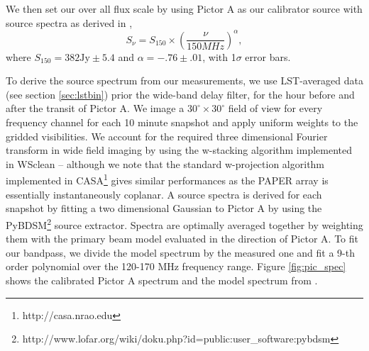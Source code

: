 \documentclass[twocolumn,numberedappendix]{emulateapj} \shorttitle{PSA64}
\begin{document}
We then set our over all flux scale by using Pictor A as our calibrator source
with source spectra as derived in \cite{jacobs_et_al2013}, 
\begin{equation}
    S_{\nu} = S_{150}\times\left(\frac{\nu}{150MHz}\right)^{\alpha},
\end{equation}
where $S_{150} = 382 \text{Jy} \pm 5.4$ and $\alpha = -.76 \pm .01$, with
1$\sigma$ error bars.




To derive the source spectrum from our measurements, we use LST-averaged data
(see section \ref{sec:lstbin}) prior the wide-band delay filter, for the hour
before and after the transit of Pictor A. We image a $30^\circ \times 30^\circ$
field of view for every frequency channel for each 10 minute snapshot and apply
uniform weights to the gridded visibilities. We account for the required three
dimensional Fourier transform in wide field imaging by using the w-stacking
algorithm implemented in WSclean \citep{offringa_et_al2014} – although we note that
the standard w-projection algorithm implemented in
CASA\footnote{http://casa.nrao.edu} gives similar performances as the PAPER
array is essentially instantaneously coplanar.  A source spectra is derived for
each snapshot by fitting a two dimensional Gaussian to Pictor A by using the
PyBDSM\footnote{http://www.lofar.org/wiki/doku.php?id=public:user\_software:pybdsm}
source extractor. Spectra are optimally averaged together by weighting them with
the primary beam model evaluated in the direction of Pictor A. To fit our
bandpass, we divide the model spectrum by the measured one and fit a 9-th order
polynomial over the 120-170 MHz frequency range. Figure \ref{fig:pic_spec} shows
the calibrated Pictor A spectrum and the model spectrum from
\cite{jacobs_et_al2013}.
\end{document}
